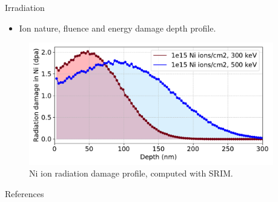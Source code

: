 \documentclass[final]{beamer}
\newlength{\sepwidth}
\newlength{\colwidth}
\newcommand{\separatorcolumn}{\begin{column}{\sepwidth}\end{column}}
\begin{document}
\begin{frame}[t]
\begin{columns}[t]
\begin{column}{\colwidth}
\begin{block}{Irradiation}
        \begin{itemize}
            \item Ion nature, fluence and energy \rightarrow damage depth profile.
        \end{itemize}

        \begin{figure}
            \centering
            \includegraphics[width=0.85\colwidth, trim=0 10 0 5, clip]{Figures/500keV_and_300keV_DPA_damage_transfer.pdf}
            \caption{Ni ion radiation damage profile, computed with SRIM.}
            \label{fig:NiIonDamage}
        \end{figure}
        
    \end{block}
        \vspace{-1.5cm}

    \begin{block}{References}

        \nocite{*}
        \footnotesize{}

        \centering

        \vspace{0.5cm}

        
    
    \end{block}

\end{column}

\separatorcolumn
\end{columns}
\end{frame}
\end{document}
